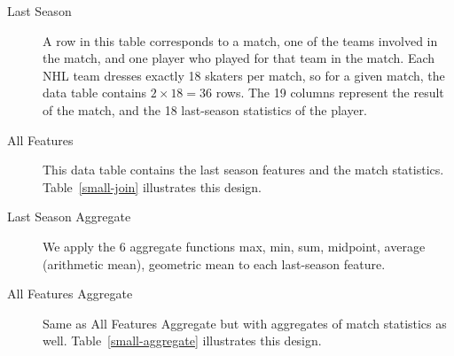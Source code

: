 \documentclass[oribibl]{llncs}%
\begin{document}
\begin{description}
\item[Last Season] A row in this table corresponds to a match, one of the teams involved in the match, and one player who played for that team in the match. Each NHL team dresses exactly 18 skaters per match, so for a given match, the data table contains $2 \times 18 = 36$ rows. The 19 columns represent the result of the match, and the 18 last-season statistics of the player.
\item[All Features] This data table contains the last season features and the match statistics.
Table~\ref{small-join} illustrates this design.
\item[Last Season Aggregate] We apply the 6 aggregate functions max, min, sum, midpoint, average (arithmetic mean), geometric mean to each last-season feature.
\item[All Features Aggregate] Same as All Features Aggregate but with aggregates of match statistics as well.
Table~\ref{small-aggregate} illustrates this design.
\end{description}
\end{document}
